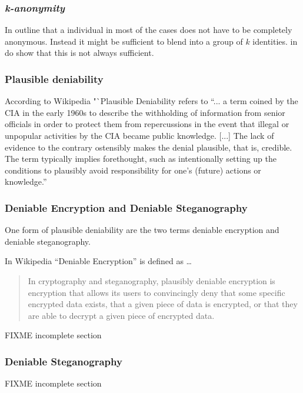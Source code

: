 \subsubsection{\itshape{k}-anonymity}
In \cite{k-anonymous:ccs2003} \citeauthor{k-anonymous:ccs2003} outline that a individual in most of the cases does not have to be completely anonymous. Instead it might be sufficient to blend into a group of $k$ identities. in \cite{wpes10-unraveling} \citeauthor{wpes10-unraveling} do show that this is not always sufficient. 

\subsubsection{Plausible deniability}
According to Wikipedia\cite{wiki:plausibleDeniability} "`Plausible Deniability refers to "`... a term coined by the CIA in the early 1960s to describe the withholding of information from senior officials in order to protect them from repercussions in the event that illegal or unpopular activities by the CIA became public knowledge. [...]  The lack of evidence to the contrary ostensibly makes the denial plausible, that is, credible. The term typically implies forethought, such as intentionally setting up the conditions to plausibly avoid responsibility for one's (future) actions or knowledge."'\par

\subsubsection{Deniable Encryption and Deniable Steganography}
One form of plausible deniability are the two terms deniable encryption and deniable steganography.

In Wikipedia\cite{wiki:deniableEncryption} "`Deniable Encryption"' is defined as \ldots
\begin{quote}
In cryptography and steganography, plausibly deniable encryption is encryption that allows its users to convincingly deny that some specific encrypted data exists, that a given piece of data is encrypted, or that they are able to decrypt a given piece of encrypted data.
\end{quote}

\cite{truecryptDFS}
FIXME incomplete section

\subsubsection{Deniable Steganography}
FIXME incomplete section

